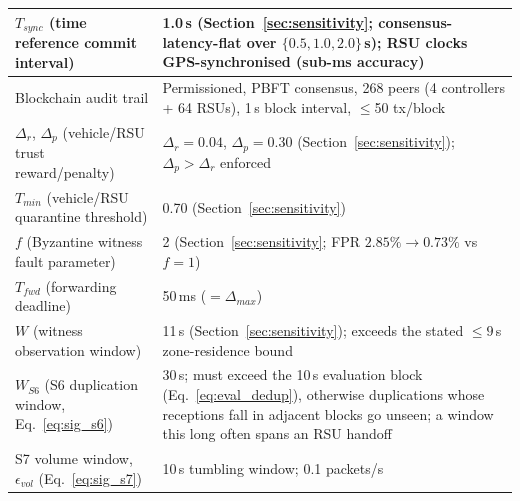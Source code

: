 \documentclass[12pt, a4paper]{report}
\begin{document}
{{\begin{longtable}{|m{5.0cm}|m{9.0cm}|}
            \hline
            $T_{sync}$ (time reference commit interval) & 1.0\,s (Section~\ref{sec:sensitivity}; consensus-latency-flat over $\{0.5,1.0,2.0\}$\,s); RSU clocks GPS-synchronised (sub-ms accuracy) \\
            \hline
Blockchain audit trail & Permissioned, PBFT consensus, 268 peers (4 controllers + 64 RSUs), 1\,s block interval, $\leq$50 tx/block \\
            \hline
            $\Delta_r$, $\Delta_p$ (vehicle/RSU trust reward/penalty) & $\Delta_r=0.04$, $\Delta_p=0.30$ (Section~\ref{sec:sensitivity}); $\Delta_p > \Delta_r$ enforced \\
            \hline
            $T_{min}$ (vehicle/RSU quarantine threshold) & 0.70 (Section~\ref{sec:sensitivity}) \\
            \hline
            $f$ (Byzantine witness fault parameter) & 2 (Section~\ref{sec:sensitivity}; \ac{FPR} $2.85\%\to0.73\%$ vs $f{=}1$) \\
            \hline
            $T_{fwd}$ (forwarding deadline) & 50\,ms ($= \Delta_{max}$) \\
            \hline
            $W$ (witness observation window) & 11\,s (Section~\ref{sec:sensitivity}); exceeds the stated $\leq 9$\,s zone-residence bound \\
\hline $W_{S6}$ (S6 duplication window, Eq.~\ref{eq:sig_s6}) & 30\,s; must exceed the 10\,s evaluation block (Eq.~\ref{eq:eval_dedup}), otherwise duplications whose receptions fall in adjacent blocks go unseen; a window this long often spans an \ac{RSU} handoff \\
\hline S7 volume window, $\epsilon_{vol}$ (Eq.~\ref{eq:sig_s7}) & 10\,s tumbling window; 0.1 packets/s \\
                

\end{longtable}}}
\end{document}
